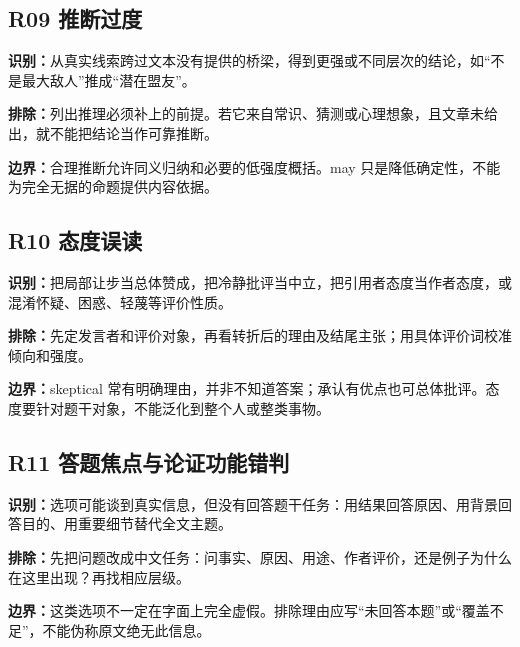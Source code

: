 \documentclass[11pt,a4paper]{article}
\begin{document}
\subsection{R09 推断过度}\label{cat-R09}
\noindent\textbf{识别：}从真实线索跨过文本没有提供的桥梁，得到更强或不同层次的结论，如“不是最大敌人”推成“潜在盟友”。\par
\noindent\textbf{排除：}列出推理必须补上的前提。若它来自常识、猜测或心理想象，且文章未给出，就不能把结论当作可靠推断。\par
\noindent\textbf{边界：}合理推断允许同义归纳和必要的低强度概括。may 只是降低确定性，不能为完全无据的命题提供内容依据。\par
{}
\subsection{R10 态度误读}\label{cat-R10}
\noindent\textbf{识别：}把局部让步当总体赞成，把冷静批评当中立，把引用者态度当作者态度，或混淆怀疑、困惑、轻蔑等评价性质。\par
\noindent\textbf{排除：}先定发言者和评价对象，再看转折后的理由及结尾主张；用具体评价词校准倾向和强度。\par
\noindent\textbf{边界：}skeptical 常有明确理由，并非不知道答案；承认有优点也可总体批评。态度要针对题干对象，不能泛化到整个人或整类事物。\par
{}
\subsection{R11 答题焦点与论证功能错判}\label{cat-R11}
\noindent\textbf{识别：}选项可能谈到真实信息，但没有回答题干任务：用结果回答原因、用背景回答目的、用重要细节替代全文主题。\par
\noindent\textbf{排除：}先把问题改成中文任务：问事实、原因、用途、作者评价，还是例子为什么在这里出现？再找相应层级。\par
\noindent\textbf{边界：}这类选项不一定在字面上完全虚假。排除理由应写“未回答本题”或“覆盖不足”，不能伪称原文绝无此信息。\par
{}
\end{document}
